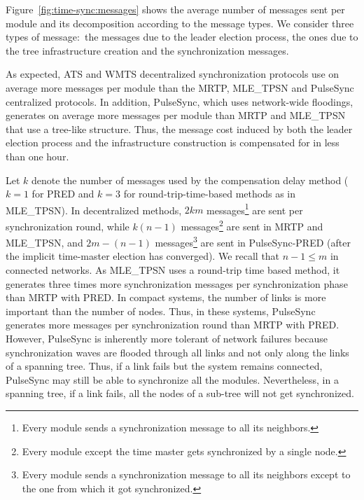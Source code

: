 Figure~\ref{fig:time-sync:messages} shows the average number of messages sent per module and its decomposition according to the message types. We consider three types of message:~the messages due to the leader election process, the ones due to the tree infrastructure creation and the synchronization messages. 

As expected, ATS and WMTS decentralized synchronization protocols use on average more messages per module than the MRTP, MLE\_TPSN and PulseSync centralized protocols. In addition, PulseSync, which uses network-wide floodings, generates on average more messages per module than MRTP and MLE\_TPSN that use a tree-like structure. Thus, the message cost induced by both the leader election process and the infrastructure construction is compensated for in less than one hour.

Let $k$ denote the number of messages used by the compensation delay method ($k = 1$ for PRED and $k = 3$ for round-trip-time-based methods as in MLE\_TPSN). In decentralized methods, $2km$ messages\footnote{Every module sends a synchronization message to all its neighbors.} are sent per synchronization round, while $k(n-1)$ messages\footnote{Every module except the time master gets synchronized by a single node.} are sent in MRTP and MLE\_TPSN, and $2m - (n-1)$ messages\footnote{Every module sends a synchronization message to all its neighbors except to the one from which it got synchronized.} are sent in PulseSync-PRED (after the implicit time-master election has converged). We recall that $n-1 \leq m$ in connected networks. As MLE\_TPSN uses a round-trip time based method, it generates three times more synchronization messages per synchronization phase than MRTP with PRED. In compact systems, the number of links is more important than the number of nodes. Thus, in these systems, PulseSync generates more messages per synchronization round than MRTP with PRED. However, PulseSync is inherently more tolerant of network failures because synchronization waves are flooded through all links and not only along the links of a spanning tree. Thus, if a link fails but the system remains connected, PulseSync may still be able to synchronize all the modules. Nevertheless, in a spanning tree, if a link fails, all the nodes of a sub-tree will not get synchronized.

